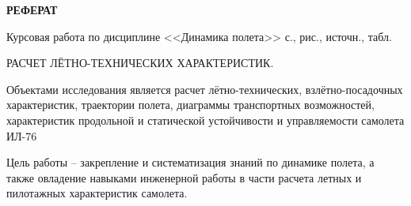 \begin{center}
\textbf{\large РЕФЕРАТ}
\end{center}

Курсовая работа по дисциплине <<Динамика полета>> \pageref{LastPage} с.,  рис.,  источн.,  табл. 

РАСЧЕТ ЛЁТНО-ТЕХНИЧЕСКИХ ХАРАКТЕРИСТИК.

Объектами исследования является расчет лётно-технических,
взлётно-посадочных характеристик, траектории полета, диаграммы
транспортных возможностей, характеристик продольной и статической
устойчивости и управляемости самолета ИЛ-76

Цель работы – закрепление и систематизация знаний по динамике
полета, а также овладение навыками инженерной работы в части расчета
летных и пилотажных характеристик самолета.

